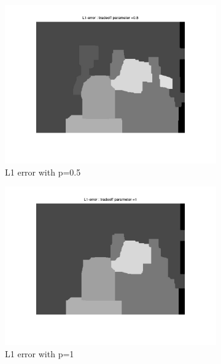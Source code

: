 \documentclass[fleqn]{article}
\begin{document}
\begin{figure}
 \begin{subfigure}{0.5\textwidth}
\includegraphics[scale=0.2]{./pics/tsukuba_L1_error_p=0.5.jpg}
\caption{L1 error with p=0.5}
\end{subfigure}
 \begin{subfigure}{0.5\textwidth}
\includegraphics[scale=0.2]{./pics/tsukuba_L1_error_p=1.jpg}
\caption{L1 error with p=1}
\end{subfigure}
 \begin{subfigure}{0.5\textwidth}

\end{subfigure}
\end{figure}
\end{document}
